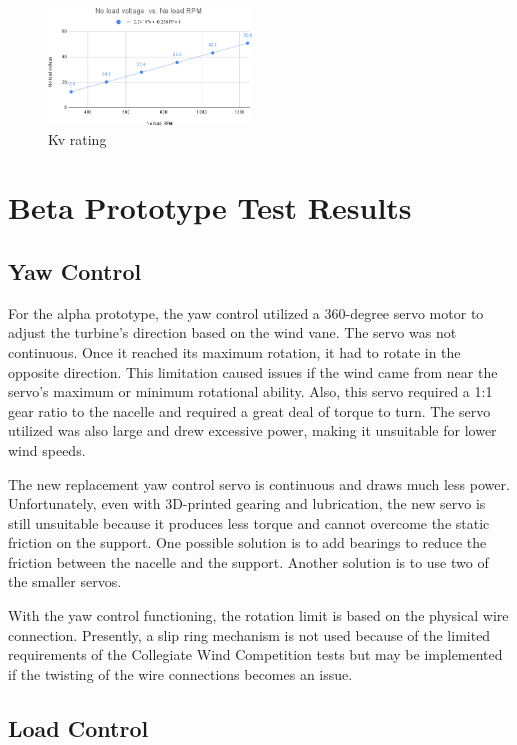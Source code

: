 \documentclass[11pt,letterpaper,conference]{IEEEtran}
\begin{document}
\begin{figure}[th]
    \centering
    \includegraphics[width=0.48\textwidth]{images/kv.png}
    \caption{Kv rating}
    \label{img:kv}
\end{figure}

\section{Beta Prototype Test Results}
\subsection{Yaw Control}
\label{sec:yaw_control}

For the alpha prototype, the yaw control utilized a 360-degree servo motor to
adjust the turbine's direction based on the wind vane. The servo was not
continuous. Once it reached its maximum rotation, it had to rotate in the
opposite direction. This limitation caused issues if the wind came from near the
servo's maximum or minimum rotational ability. Also, this servo required a 1:1
gear ratio to the nacelle and required a great deal of torque to turn. The
servo utilized was also large and drew excessive power, making it unsuitable
for lower wind speeds.

The new replacement yaw control servo is continuous and draws much less power.
Unfortunately, even with 3D-printed gearing and lubrication, the new servo is still unsuitable because it produces less torque and cannot overcome the static friction on the support. One possible solution is to add bearings to reduce the friction between the nacelle and the support. Another solution is to use two of the smaller servos.

With the yaw control functioning, the rotation limit is based on the physical wire connection. Presently, a slip ring mechanism is not used because of the limited requirements of the Collegiate Wind Competition tests but may be implemented if the twisting
of the wire connections becomes an issue.


\subsection{Load Control}
\label{sec:load_control}
\end{document}
